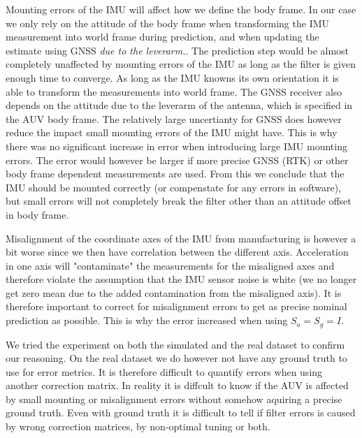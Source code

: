 Mounting errors of the IMU will affect how we define the body frame. In our case we only rely on the attitude of the body frame when transforming the IMU measurement into world frame during prediction, and when updating the estimate using GNSS \textit{due to the leverarm.}. The prediction step would be almost completely unaffected by mounting errors of the IMU as long as the filter is given enough time to converge. As long as the IMU knowns its own orientation it is able to transform the measurements into world frame. The GNSS receiver also depends on the attitude due to the leverarm of the antenna, which is specified in the AUV body frame. The relatively large uncertianty for GNSS does however reduce the impact small mounting errors of the IMU might have. This is why there was no significant increase in error when introducing large IMU mounting errors. The error would however be larger if more precise GNSS (RTK) or other body frame dependent measurements are used. From this we conclude that the IMU should be mounted correctly (or compenstate for any errors in software), but small errors will not completely break the filter other than an attitude offset in body frame.

Misalignment of the coordinate axes of the IMU from manufacturing is however a bit worse since we then have correlation between the different axis. Acceleration in one axis will "contaminate" the measurements for the misaligned axes and therefore violate the assumption that the IMU sensor noise is white (we no longer get zero mean due to the added contamination from the misaligned axis). It is therefore important to correct for misalignment errors to get as precise nominal prediction as possible. This is why the error increased when using $S_a = S_g = I$.

We tried the experiment on both the simulated and the real dataset to confirm our reasoning. On the real dataset we do however not have any ground truth to use for error metrics. It is therefore difficult to quantify errors when using another correction matrix. In reality it is diffcult to know if the AUV is affected by small mounting or misalignment errors without somehow aquiring a precise ground truth. Even with ground truth it is difficult to tell if filter errors is caused by wrong correction matrices, by non-optimal tuning or both.
